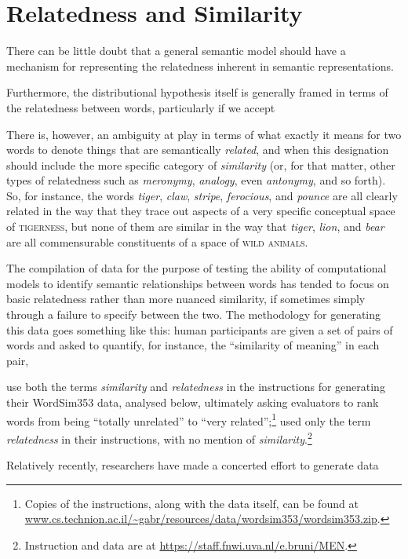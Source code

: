 \section{Relatedness and Similarity}
There can be little doubt that a general semantic model should have a mechanism for representing the relatedness inherent in semantic representations.

Furthermore, the distributional hypothesis itself is generally framed in terms of the relatedness between words, particularly if we accept 

There is, however, an ambiguity at play in terms of what exactly it means for two words to denote things that are semantically \emph{related}, and when this designation should include the more specific category of \emph{similarity} (or, for that matter, other types of relatedness such as \emph{meronymy}, \emph{analogy}, even \emph{antonymy}, and so forth).  So, for instance, the words \emph{tiger}, \emph{claw}, \emph{stripe}, \emph{ferocious}, and \emph{pounce} are all clearly related in the way that they trace out aspects of a very specific conceptual space of \textsc{tigerness}, but none of them are similar in the way that \emph{tiger}, \emph{lion}, and \emph{bear} are all commensurable constituents of a space of \textsc{wild animals}.

The compilation of data for the purpose of testing the ability of computational models to identify semantic relationships between words has tended to focus on basic relatedness rather than more nuanced similarity, if sometimes simply through a failure to specify between the two.  The methodology for generating this data goes something like this: human participants are given a set of pairs of words and asked to quantify, for instance, the ``similarity of meaning'' \citep[][p. 628]{RubensteinEA1965} in each pair, 

\cite{FinkelsteinEA2002} use both the terms \emph{similarity} and \emph{relatedness} in the instructions for generating their WordSim353 data, analysed below, ultimately asking evaluators to rank words from being ``totally unrelated'' to ``very related'';\footnote{Copies of the instructions, along with the data itself, can be found at \url{www.cs.technion.ac.il/~gabr/resources/data/wordsim353/wordsim353.zip}.} \cite{BruniEA2012} used only the term \emph{relatedness} in their instructions, with no mention of \emph{similarity}.\footnote{Instruction and data are at \url{https://staff.fnwi.uva.nl/e.bruni/MEN}.}

Relatively recently, researchers have made a concerted effort to generate data 

